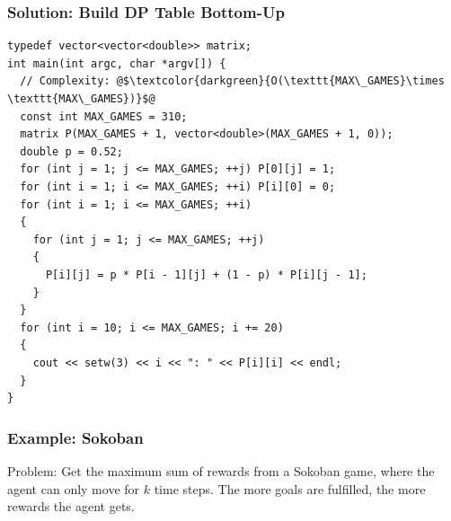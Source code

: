 \documentclass{beamer}
\begin{document}
\begin{frame}[containsverbatim]
\frametitle{Solution: Build DP Table Bottom-Up}

\scriptsize
\begin{lstlisting}
typedef vector<vector<double>> matrix;
int main(int argc, char *argv[]) {
  // Complexity: @$\textcolor{darkgreen}{O(\texttt{MAX\_GAMES}\times \texttt{MAX\_GAMES})}$@
  const int MAX_GAMES = 310;
  matrix P(MAX_GAMES + 1, vector<double>(MAX_GAMES + 1, 0));
  double p = 0.52;
  for (int j = 1; j <= MAX_GAMES; ++j) P[0][j] = 1;
  for (int i = 1; i <= MAX_GAMES; ++i) P[i][0] = 0;
  for (int i = 1; i <= MAX_GAMES; ++i)
  {
    for (int j = 1; j <= MAX_GAMES; ++j)
    {
      P[i][j] = p * P[i - 1][j] + (1 - p) * P[i][j - 1];
    }
  }
  for (int i = 10; i <= MAX_GAMES; i += 20)
  {
    cout << setw(3) << i << ": " << P[i][i] << endl;
  }
}
\end{lstlisting}

\end{frame}


\begin{frame}%
\frametitle{Example: Sokoban}

\begin{mdframed}[style=exampledefault]
Problem: Get the maximum sum of rewards from a Sokoban game,
where the agent can only move for $k$ time steps. The more
goals are fulfilled, the more rewards the agent gets.
\end{mdframed}


\end{frame}
\end{document}
